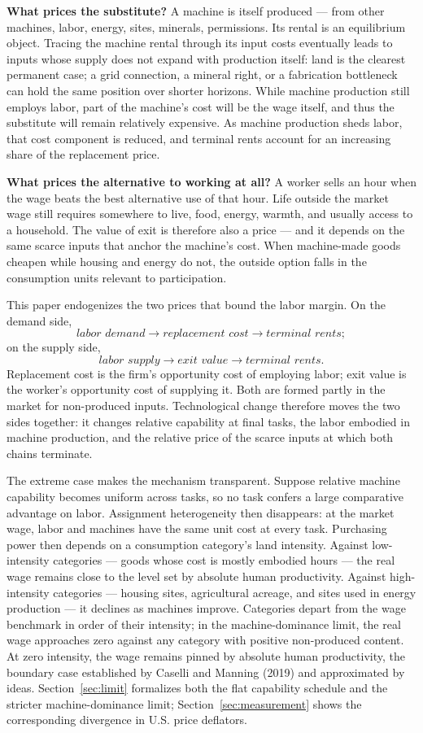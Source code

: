 \documentclass[12pt]{article}
\theoremstyle{plain}
\begin{document}
\textbf{What prices the substitute?} A machine is itself produced --- from other machines, labor, energy, sites, minerals, permissions. Its rental is an equilibrium object. Tracing the machine rental through its input costs eventually leads to inputs whose supply does not expand with production itself: land is the clearest permanent case; a grid connection, a mineral right, or a fabrication bottleneck can hold the same position over shorter horizons. While machine production still employs labor, part of the machine's cost will be the wage itself, and thus the substitute will remain relatively expensive. As machine production sheds labor, that cost component is reduced, and terminal rents account for an increasing share of the replacement price.

\textbf{What prices the alternative to working at all?} A worker sells an hour when the wage beats the best alternative use of that hour. Life outside the market wage still requires somewhere to live, food, energy, warmth, and usually access to a household. The value of exit is therefore also a price --- and it depends on the same scarce inputs that anchor the machine's cost. When machine-made goods cheapen while housing and energy do not, the outside option falls in the consumption units relevant to participation.

This paper endogenizes the two prices that bound the labor margin. On the demand side,
\[
\textit{labor demand} \to \textit{replacement cost} \to \textit{terminal rents};
\]
on the supply side,
\[
\textit{labor supply} \to \textit{exit value} \to \textit{terminal rents}.
\]
Replacement cost is the firm's opportunity cost of employing labor; exit value is the worker's opportunity cost of supplying it. Both are formed partly in the market for non-produced inputs. Technological change therefore moves the two sides together: it changes relative capability at final tasks, the labor embodied in machine production, and the relative price of the scarce inputs at which both chains terminate.

The extreme case makes the mechanism transparent. Suppose relative machine capability becomes uniform across tasks, so no task confers a large comparative advantage on labor. Assignment heterogeneity then disappears: at the market wage, labor and machines have the same unit cost at every task. Purchasing power then depends on a consumption category's land intensity. Against low-intensity categories --- goods whose cost is mostly embodied hours --- the real wage remains close to the level set by absolute human productivity. Against high-intensity categories --- housing sites, agricultural acreage, and sites used in energy production --- it declines as machines improve. Categories depart from the wage benchmark in order of their intensity; in the machine-dominance limit, the real wage approaches zero against any category with positive non-produced content. At zero intensity, the wage remains pinned by absolute human productivity, the boundary case established by Caselli and Manning (2019) and approximated by ideas. Section~\ref{sec:limit} formalizes both the flat capability schedule and the stricter machine-dominance limit; Section~\ref{sec:measurement} shows the corresponding divergence in U.S. price deflators.
\end{document}
